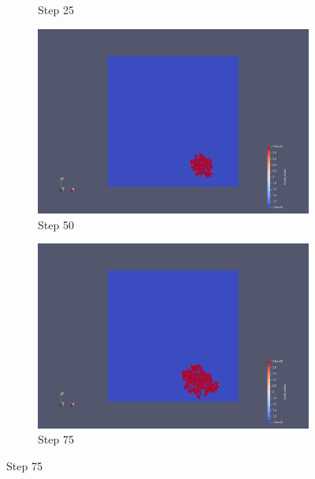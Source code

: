 \documentclass[a4paper,12pt]{article}
\begin{document}
\begin{figure}
\begin{subfigure}{0.4\textwidth}
    \caption{Step 25}
\end{subfigure}
\hfill
\begin{subfigure}{0.4\textwidth}
    \includegraphics[width=\textwidth]{../images/vtk/ex1/step_50.png}
    \caption{Step 50}
\end{subfigure}
\hfill
\begin{subfigure}{0.4\textwidth}
    \includegraphics[width=\textwidth]{../images/vtk/ex1/step_75.png}
    \caption{Step 75}
\end{subfigure}


\end{figure}
\end{document}
